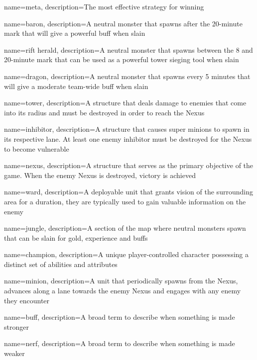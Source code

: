 
{
    name=meta,
    description={The most effective strategy for winning}
}

{
    name=baron,
    description={A neutral monster that spawns after the 20-minute mark that will give a powerful buff when slain}
}

{
    name=rift herald,
    description={A neutral monster that spawns between the 8 and 20-minute mark that can be used as a powerful tower sieging tool when slain}
}

{
    name=dragon,
    description={A neutral monster that spawns every 5 minutes that will give a moderate team-wide buff when slain}
}

{
    name=tower,
    description={A structure that deals damage to enemies that come into its radius and must be destroyed in order to reach the Nexus}
}

{
    name=inhibitor,
    description={A structure that causes super minions to spawn in its respective lane. At least one enemy inhibitor must be destroyed for the Nexus to become vulnerable}
}

{
    name=nexus,
    description={A structure that serves as the primary objective of the game.
    When the enemy Nexus is destroyed, victory is achieved}
}

{
    name=ward,
    description={A deployable unit that grants vision of the surrounding area for a duration, they are typically used to gain valuable information on the enemy}
}

{
    name=jungle,
    description={A section of the map where neutral monsters spawn that can be slain for gold, experience and buffs}
}

{
    name=champion,
    description={A unique player-controlled character possessing a distinct set of abilities and attributes}
}

{
    name=minion,
    description={A unit that periodically spawns from the Nexus, advances along a lane towards the enemy Nexus and engages with any enemy they encounter}
}

{
    name=buff,
    description={A broad term to describe when something is made stronger}
}

{
    name=nerf,
    description={A broad term to describe when something is made weaker}
}
